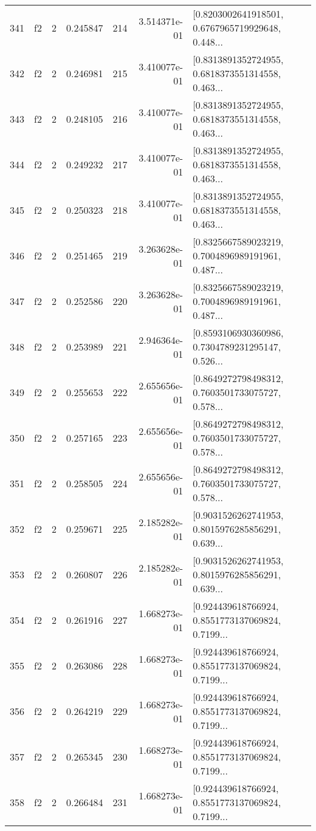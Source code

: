 \begin{tabular}{lllrlrl}
341 &  f2 &   2 &  0.245847 &  214 &  3.514371e-01 &  [0.8203002641918501, 0.6767965719929648, 0.448... \\
342 &  f2 &   2 &  0.246981 &  215 &  3.410077e-01 &  [0.8313891352724955, 0.6818373551314558, 0.463... \\
343 &  f2 &   2 &  0.248105 &  216 &  3.410077e-01 &  [0.8313891352724955, 0.6818373551314558, 0.463... \\
344 &  f2 &   2 &  0.249232 &  217 &  3.410077e-01 &  [0.8313891352724955, 0.6818373551314558, 0.463... \\
345 &  f2 &   2 &  0.250323 &  218 &  3.410077e-01 &  [0.8313891352724955, 0.6818373551314558, 0.463... \\
346 &  f2 &   2 &  0.251465 &  219 &  3.263628e-01 &  [0.8325667589023219, 0.7004896989191961, 0.487... \\
347 &  f2 &   2 &  0.252586 &  220 &  3.263628e-01 &  [0.8325667589023219, 0.7004896989191961, 0.487... \\
348 &  f2 &   2 &  0.253989 &  221 &  2.946364e-01 &  [0.8593106930360986, 0.7304789231295147, 0.526... \\
349 &  f2 &   2 &  0.255653 &  222 &  2.655656e-01 &  [0.8649272798498312, 0.7603501733075727, 0.578... \\
350 &  f2 &   2 &  0.257165 &  223 &  2.655656e-01 &  [0.8649272798498312, 0.7603501733075727, 0.578... \\
351 &  f2 &   2 &  0.258505 &  224 &  2.655656e-01 &  [0.8649272798498312, 0.7603501733075727, 0.578... \\
352 &  f2 &   2 &  0.259671 &  225 &  2.185282e-01 &  [0.9031526262741953, 0.8015976285856291, 0.639... \\
353 &  f2 &   2 &  0.260807 &  226 &  2.185282e-01 &  [0.9031526262741953, 0.8015976285856291, 0.639... \\
354 &  f2 &   2 &  0.261916 &  227 &  1.668273e-01 &  [0.924439618766924, 0.8551773137069824, 0.7199... \\
355 &  f2 &   2 &  0.263086 &  228 &  1.668273e-01 &  [0.924439618766924, 0.8551773137069824, 0.7199... \\
356 &  f2 &   2 &  0.264219 &  229 &  1.668273e-01 &  [0.924439618766924, 0.8551773137069824, 0.7199... \\
357 &  f2 &   2 &  0.265345 &  230 &  1.668273e-01 &  [0.924439618766924, 0.8551773137069824, 0.7199... \\
358 &  f2 &   2 &  0.266484 &  231 &  1.668273e-01 &  [0.924439618766924, 0.8551773137069824, 0.7199... \\

\end{tabular}
